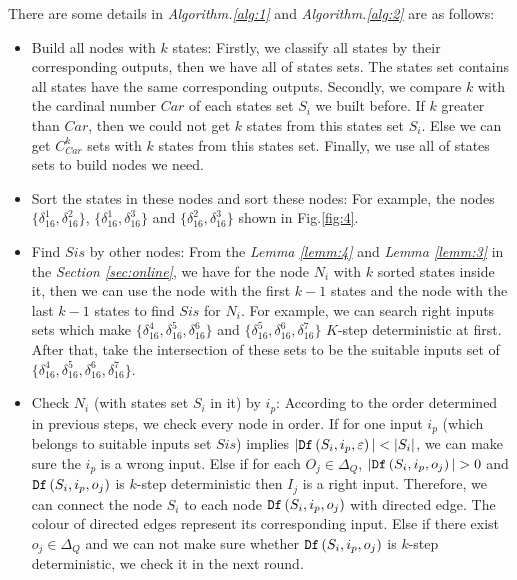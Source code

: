 There are some details in {\em Algorithm.\ref{alg:1}} and {\em Algorithm.\ref{alg:2}} are as follows:
\begin{itemize}
\item Build all nodes with $k$ states: Firstly, we classify all states by their corresponding outputs, then we have all of states sets. The states set contains all states have the same corresponding outputs. Secondly, we compare $k$ with the cardinal number $Car$ of each states set $S_i$ we built before. If $k$ greater than $Car$, then we could not get $k$ states from this states set $S_i$. Else we can get $C_{Car}^k$ sets with $k$ states from this states set. Finally, we use all of states sets to build nodes we need. 
 \item Sort the states in these nodes and sort these nodes: For example, the nodes $\{\delta_{16}^1,\delta_{16}^2\}$, $\{\delta_{16}^1,\delta_{16}^3\}$ and $\{\delta_{16}^2,\delta_{16}^3\}$ shown in Fig.\ref{fig:4}. 
  \item Find $Sis$ by other nodes: From the {\em Lemma \ref{lemm:4}} and {\em Lemma \ref{lemm:3}} in the {\em Section \ref{sec:online}}, we have for the node $N_i$ with $k$ sorted states inside it, then we can use the node with the first $k-1$ states and the node with the last $k-1$ states to find $Sis$ for $N_i$. For example, we can search right inputs sets which make $\{\delta_{16}^4,\delta_{16}^5,\delta_{16}^6\}$ and $\{\delta_{16}^5,\delta_{16}^6,\delta_{16}^7\}$ $K$-step deterministic at first. After that, take the intersection of these sets to be the suitable inputs set of $\{\delta_{16}^4,\delta_{16}^5,\delta_{16}^6,\delta_{16}^7\}$. 
  \item Check $N_i$ (with states set $S_i$ in it) by $i_p$: According to the order determined in previous steps, we check every node in order. If for one input $i_p$ (which belongs to suitable inputs set $Sis$) implies $|\Ded\left(S_i,i_p,\varepsilon\right)|<|S_i|$, we can make sure the $i_p$ is a wrong input. Else if for each $O_j \in \Delta_Q$, $|\Ded\left(S_i,i_p,o_j\right)|>0$ and ${\tt Df}\left(S_i,i_p,o_j\right)$ is $k$-step deterministic then $I_j$ is a right input. Therefore, we can connect the node $S_i$ to each node ${\tt Df}\left(S_i,i_p,o_j\right)$ with directed edge. The colour of directed edges represent its corresponding input. Else if there exist $o_j \in \Delta_Q$ and we can not make sure whether ${\tt Df}\left(S_i,i_p,o_j\right)$ is $k$-step deterministic, we check it in the next round. 
\end{itemize} 



